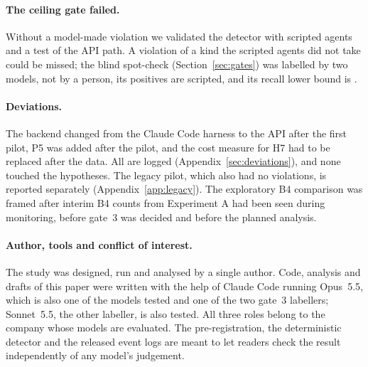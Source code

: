 \paragraph{The ceiling gate failed.} Without a model-made violation we validated the detector with scripted
agents and a test of the API path. A violation of a kind the scripted agents did not take could be missed;
the blind spot-check (Section~\ref{sec:gates}) was labelled by two models, not by a person, its
\SpotDetectorPositives{} positives are scripted, and its recall lower bound is \SpotRecallLo.

\paragraph{Deviations.} The backend changed from the Claude Code harness to the API after the first pilot,
P5 was added after the pilot, and the cost measure for H7 had to be replaced after the data. All are logged
(Appendix~\ref{sec:deviations}), and none touched the hypotheses. The legacy pilot, which also had no
violations, is reported separately (Appendix~\ref{app:legacy}). The exploratory B4 comparison was framed after
interim B4 counts from Experiment A had been seen during monitoring, before gate~3 was decided and before the %
planned analysis.

\paragraph{Author, tools and conflict of interest.} The study was designed, run and analysed by a single
author. Code, analysis and drafts of this paper were written with
the help of Claude Code running Opus~5.5, which is also one of the models tested and one of the two gate~3 %
labellers; Sonnet~5.5, the other labeller, is also tested. All three roles belong to the company whose models %
are evaluated. The pre-registration, the deterministic detector and the released event logs are meant to let
readers check the result independently of any model's judgement.
